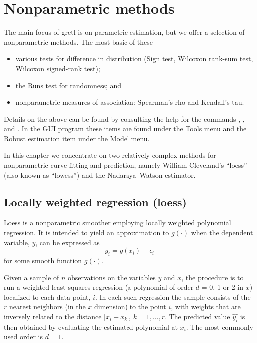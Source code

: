\chapter{Nonparametric methods}
\label{chap:nonparam}

The main focus of gretl is on parametric estimation, but we offer a
selection of nonparametric methods. The most basic of these
%
\begin{itemize}
\item various tests for difference in distribution (Sign test,
  Wilcoxon rank-sum test, Wilcoxon signed-rank test);
\item the Runs test for randomness; and
\item nonparametric measures of association: Spearman's rho and
  Kendall's tau.
\end{itemize}

Details on the above can be found by consulting the help for the
commands , ,  and .
In the GUI program these items are found under the \textsf{Tools} menu
and the \textsf{Robust estimation} item under the \textsf{Model} menu.

In this chapter we concentrate on two relatively complex methods for
nonparametric curve-fitting and prediction, namely William
Cleveland's ``loess'' (also known as ``lowess'') and the
Nadaraya--Watson estimator.

\section{Locally weighted regression (loess)}
\label{sec:loess}

Loess \citep{cleveland79} is a nonparametric smoother employing
locally weighted polynomial regression. It is intended to yield an
approximation to $g(\cdot)$ when the dependent variable, $y$, can be
expressed as
\[
y_i = g(x_i) + \epsilon_i
\]
for some smooth function $g(\cdot)$.

Given a sample of $n$ observations on the variables $y$ and $x$, the
procedure is to run a weighted least squares regression (a polynomial
of order $d$ = 0, 1 or 2 in $x$) localized to each data point, $i$. In
each such regression the sample consists of the $r$ nearest neighbors
(in the $x$ dimension) to the point $i$, with weights that are
inversely related to the distance $|x_i - x_k|$, $k=1,\dots,r$. The
predicted value $\hat{y_i}$ is then obtained by evaluating the
estimated polynomial at $x_i$. The most commonly used order is $d=1$.

